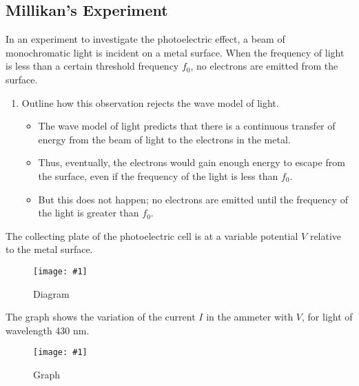 \documentclass[a4paper,12pt]{article}
\newcommand{\img}[4]{\begin{center}
  \begin{figure}[H]
    \centering
    \texttt{[image: \#1]}
    \caption{#3}
    \label{fig:#4}
  \end{figure}
\end{center}}
\begin{document}
\pagebreak

\subsection{Millikan's Experiment}

In an experiment to investigate the photoelectric effect, a beam of monochromatic light is incident on a metal surface. When the frequency of light is less than a certain threshold frequency $f_0$, no electrons are emitted from the surface.

\begin{enumerate}[label=(\alph*)]
  \item Outline how this observation rejects the wave model of light.
        \begin{itemize}
          \item The wave model of light predicts that there is a continuous transfer of energy from the beam of light to the electrons in the metal.
          \item Thus, eventually, the electrons would gain enough energy to escape from the surface, even if the frequency of the light is less than $f_0$.
          \item But this does not happen; no electrons are emitted until the frequency of the light is greater than $f_0$.
        \end{itemize}
\end{enumerate}

The collecting plate of the photoelectric cell is at a variable potential $V$ relative to the metal surface.

\img{ex/1.png}{0.5}{Diagram}{1}

The graph shows the variation of the current $I$ in the ammeter with $V$, for light of wavelength 430 nm.

\img{ex/2.png}{0.5}{Graph}{2}
\end{document}
